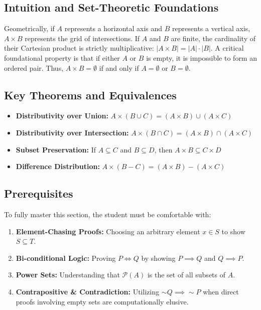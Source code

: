 \documentclass[12pt]{article}
\theoremstyle{definition}
\theoremstyle{remark}
\begin{document}
\subsection{Intuition and Set-Theoretic Foundations}
Geometrically, if $A$ represents a horizontal axis and $B$ represents a vertical axis, $A \times B$ represents the grid of intersections. If $A$ and $B$ are finite, the cardinality of their Cartesian product is strictly multiplicative: $|A \times B| = |A| \cdot |B|$. A critical foundational property is that if either $A$ or $B$ is empty, it is impossible to form an ordered pair. Thus, $A \times B = \emptyset$ if and only if $A = \emptyset$ or $B = \emptyset$.

\subsection{Key Theorems and Equivalences}
\begin{itemize}
    \item \textbf{Distributivity over Union:} $A \times (B \cup C) = (A \times B) \cup (A \times C)$
    \item \textbf{Distributivity over Intersection:} $A \times (B \cap C) = (A \times B) \cap (A \times C)$
    \item \textbf{Subset Preservation:} If $A \subseteq C$ and $B \subseteq D$, then $A \times B \subseteq C \times D$
    \item \textbf{Difference Distribution:} $A \times (B - C) = (A \times B) - (A \times C)$
\end{itemize}

\subsection{Prerequisites}
To fully master this section, the student must be comfortable with:
\begin{enumerate}
    \item \textbf{Element-Chasing Proofs:} Choosing an arbitrary element $x \in S$ to show $S \subseteq T$.
    \item \textbf{Bi-conditional Logic:} Proving $P \iff Q$ by showing $P \implies Q$ and $Q \implies P$.
    \item \textbf{Power Sets:} Understanding that $\mathcal{P}(A)$ is the set of all subsets of $A$.
    \item \textbf{Contrapositive \& Contradiction:} Utilizing $\sim Q \implies \sim P$ when direct proofs involving empty sets are computationally elusive.
\end{enumerate}
\end{document}
